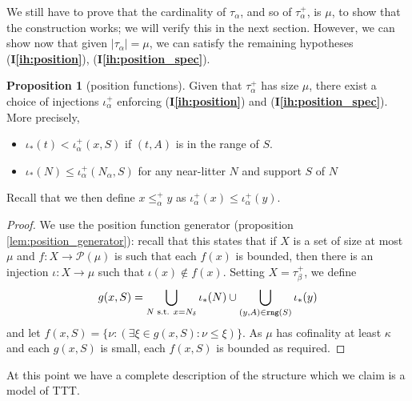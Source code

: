 \documentclass{article}
\newif\ifshowannotations
\newcommand{\annot}[1]{\ifshowannotations\marginpar{#1}\fi}
\theoremstyle{definition}
\newtheorem{proposition}[theorem]{Proposition}
\theoremstyle{remark}
\newcommand{\ihref}[1]{(\textbf{I\ref{#1}})}
\begin{document}
{We still have to prove that the cardinality of $\tau_\alpha$, and so of $\tau^+_\alpha$, is $\mu$, to show that the construction works; we will verify this in the next section.
However, we can show now that given $|\tau_\alpha| = \mu$, we can satisfy the remaining hypotheses \ihref{ih:position}, \ihref{ih:position_spec}.

\begin{proposition}[position functions]
Given that $\tau_\alpha^+$ has size $\mu$, there exist a choice of injections $\iota^+_\alpha$
enforcing \ihref{ih:position} and \ihref{ih:position_spec}.
More precisely,

\begin{itemize}

\item $\iota_*(t) < \iota^+_\alpha(x,S)$ if $(t,A)$ is in the range of $S$.

\item $\iota_*(N) \leq \iota^+_\alpha(N_\alpha,S)$ for any near-litter $N$ and support $S$ of $N$


\end{itemize}

Recall that we then define $x \leq^+_\alpha y$ as $\iota^+_\alpha(x) \leq \iota^+_\alpha(y)$.
\end{proposition}
\begin{proof}
We use the position function generator (proposition \ref{lem:position_generator}): recall that this states that if $X$ is a set of size at most $\mu$ and $f : X \to \mathcal P(\mu)$ is such that each $f(x)$ is bounded, then there is an injection $\iota : X \to \mu$ such that $\iota(x) \not\in f(x)$.
Setting $X = \tau^+_\beta$, we define
$$ g(x, S) = \bigcup_{N \text{ s.t. } x = N_\delta} \iota_*(N) \cup \bigcup_{(y,A) \in {\tt rng}(S)} \iota_*(y) $$
and let $f(x, S) = \{ \nu : (\exists \xi \in g(x, S) : \nu \leq \xi) \}$.
As $\mu$ has cofinality at least $\kappa$ and each $g(x, S)$ is small, each $f(x, S)$ is bounded as required.
\end{proof}

At this point we have a complete description of the structure which we claim is a model of TTT.

}
\end{document}

